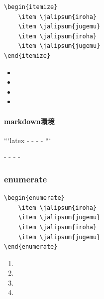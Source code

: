 \documentclass[
    article,
    head_space=25truemm,
    foot_space=10truemm,
    gutter=15truemm]{jlreq}
\begin{document}
\begin{verbatim}
\begin{itemize}
    \item \jalipsum{iroha}
    \item \jalipsum{jugemu}
    \item \jalipsum{iroha}
    \item \jalipsum{jugemu}
\end{itemize}
\end{verbatim}

\begin{itemize}
    \item {}
    \item {}
    \item {}
    \item {}
\end{itemize}

\paragraph{markdown環境}

\begin{markdown}
```latex
- 
- 
- 
- 
```
\end{markdown}

\begin{markdown}
- 
- 
- 
- 
\end{markdown}

\subsubsection{enumerate}

\begin{verbatim}
\begin{enumerate}
    \item \jalipsum{iroha}
    \item \jalipsum{jugemu}
    \item \jalipsum{iroha}
    \item \jalipsum{jugemu}
\end{enumerate}
\end{verbatim}

\begin{enumerate}
    \item {}
    \item {}
    \item {}
    \item {}
\end{enumerate}
\end{document}
